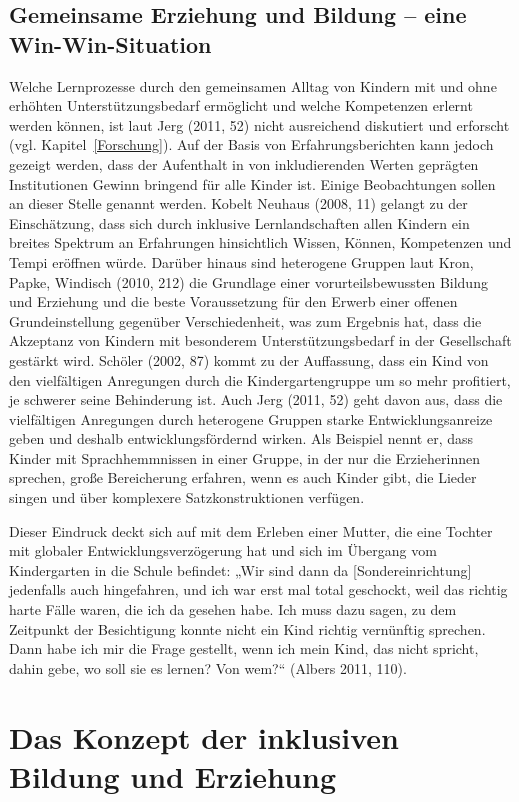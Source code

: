 \subsection{Gemeinsame Erziehung und Bildung -- eine Win-Win-Situation}
Welche Lernprozesse durch den gemeinsamen Alltag von Kindern mit und ohne erhöhten Unterstützungsbedarf ermöglicht und welche Kompetenzen erlernt werden können, ist laut Jerg (2011, 52) nicht ausreichend diskutiert und erforscht (vgl. Kapitel~\ref{Forschung}).
Auf der Basis von Erfahrungsberichten kann jedoch gezeigt werden, dass der Aufenthalt in von inkludierenden Werten geprägten Institutionen Gewinn bringend für alle Kinder ist. Einige Beobachtungen sollen an dieser Stelle genannt werden. 
Kobelt Neuhaus (2008, 11) gelangt zu der Einschätzung, dass sich durch inklusive Lernlandschaften allen Kindern ein breites Spektrum an Erfahrungen hinsichtlich Wissen, Können, Kompetenzen und Tempi eröffnen würde. 
Darüber hinaus sind heterogene Gruppen laut Kron, Papke, Windisch (2010, 212) die Grundlage einer vorurteilsbewussten Bildung und Erziehung und die beste Voraussetzung für den Erwerb einer offenen Grundeinstellung gegenüber Verschiedenheit, was zum Ergebnis hat, dass die Akzeptanz von Kindern mit besonderem Unterstützungsbedarf in der Gesellschaft gestärkt wird.  
Schöler (2002, 87) kommt zu der Auffassung, dass ein Kind von den vielfältigen Anregungen durch die Kindergartengruppe um so mehr profitiert, je schwerer seine Behinderung ist. 
Auch Jerg (2011, 52) geht davon aus, dass die vielfältigen Anregungen durch heterogene Gruppen starke Entwicklungsanreize geben und deshalb entwicklungsfördernd wirken. Als Beispiel nennt er, dass Kinder mit Sprachhemmnissen in einer Gruppe, in der nur die Erzieherinnen sprechen, große Bereicherung erfahren, wenn es auch Kinder gibt, die Lieder singen und über komplexere Satzkonstruktionen verfügen.

Dieser Eindruck deckt sich auf mit dem Erleben einer Mutter, die eine Tochter mit globaler Entwicklungsverzögerung hat und sich im Übergang vom Kindergarten in die Schule befindet: 
„Wir sind dann da [Sondereinrichtung] jedenfalls auch hingefahren, und ich war erst mal total geschockt, weil das richtig harte Fälle waren, die ich da gesehen habe. Ich muss dazu sagen, zu dem Zeitpunkt der Besichtigung konnte nicht ein Kind richtig vernünftig sprechen. Dann habe ich mir die Frage gestellt, wenn ich mein Kind, das nicht spricht, dahin gebe, wo soll sie es lernen? Von wem?“ (Albers 2011, 110).

\section{Das Konzept der inklusiven Bildung und Erziehung}\label{sec:Inklusionsverstandnis}

